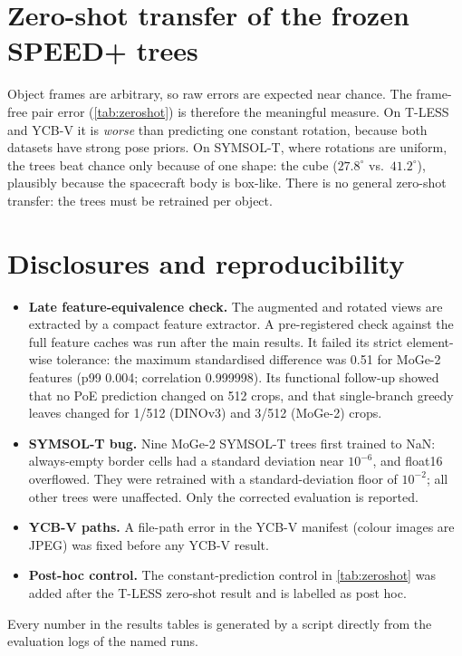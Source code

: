 \section{Zero-shot transfer of the frozen SPEED+ trees}
\label{sec:supp_zeroshot}
\begin{table}[h]
  \centering\footnotesize
  \setlength{\tabcolsep}{3pt}
  
  \caption{\textbf{Zero-shot}: frozen SPEED+ PoE trees with orbit voting, no retraining, test split. The pair error $\min_S\angle(\hat R_i\hat R_j^\top, R_iSR_j^\top)$ over random same-object pairs cancels the unknown offset between object frames. \emph{Chance}: uniformly random predictions. \emph{Constant}: one rotation predicted for every image.}
  \label{tab:zeroshot}
\end{table}
Object frames are arbitrary, so raw errors are expected near chance. The frame-free pair error (\cref{tab:zeroshot}) is therefore the meaningful measure. On T-LESS and YCB-V it is \emph{worse} than predicting one constant rotation, because both datasets have strong pose priors. On SYMSOL-T, where rotations are uniform, the trees beat chance only because of one shape: the cube ($27.8^\circ$ vs.\ $41.2^\circ$), plausibly because the spacecraft body is box-like. There is no general zero-shot transfer: the trees must be retrained per object.

\section{Disclosures and reproducibility}
\begin{itemize}
\item \textbf{Late feature-equivalence check.} The augmented and rotated views are extracted by a compact feature extractor. A pre-registered check against the full feature caches was run after the main results. It failed its strict element-wise tolerance: the maximum standardised difference was 0.51 for MoGe-2 features (p99 0.004; correlation 0.999998). Its functional follow-up showed that no PoE prediction changed on 512 crops, and that single-branch greedy leaves changed for 1/512 (DINOv3) and 3/512 (MoGe-2) crops.
\item \textbf{SYMSOL-T bug.} Nine MoGe-2 SYMSOL-T trees first trained to NaN: always-empty border cells had a standard deviation near $10^{-6}$, and float16 overflowed. They were retrained with a standard-deviation floor of $10^{-2}$; all other trees were unaffected. Only the corrected evaluation is reported.
\item \textbf{YCB-V paths.} A file-path error in the YCB-V manifest (colour images are JPEG) was fixed before any YCB-V result.
\item \textbf{Post-hoc control.} The constant-prediction control in \cref{tab:zeroshot} was added after the T-LESS zero-shot result and is labelled as post hoc.
\end{itemize}
Every number in the results tables is generated by a script directly from the evaluation logs of the named runs.

